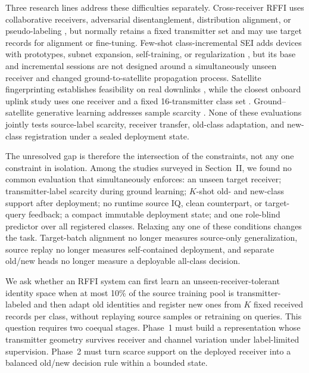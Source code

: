 \documentclass[journal]{IEEEtran}
\begin{document}
Three research lines address these difficulties separately. Cross-receiver RFFI uses collaborative receivers, adversarial disentanglement, distribution alignment, or pseudo-labeling \cite{shen2024receiveragnostic,zhang2024riei,liu2024receiverimpact,feng2025dadda,ma2025channelrobust}, but normally retains a fixed transmitter set and may use target records for alignment or fine-tuning. Few-shot class-incremental SEI adds devices with prototypes, subnet expansion, self-training, or regularization \cite{liu2021csil,li2024selftraining,shi2025dpds,li2025fscilsei,li2025mopchr}, but its base and incremental sessions are not designed around a simultaneously unseen receiver and changed ground-to-satellite propagation process. Satellite fingerprinting establishes feasibility on real downlinks \cite{oligeri2023pastai,smailes2023satiq}, while the closest onboard uplink study uses one receiver and a fixed 16-transmitter class set \cite{tang2023ttc}. Ground--satellite generative learning addresses sample scarcity \cite{zhao2026gsgl}. None of these evaluations jointly tests source-label scarcity, receiver transfer, old-class adaptation, and new-class registration under a sealed deployment state.

The unresolved gap is therefore the intersection of the constraints, not any one constraint in isolation. Among the studies surveyed in Section~II, we found no common evaluation that simultaneously enforces: an unseen target receiver; transmitter-label scarcity during ground learning; \(K\)-shot old- and new-class support after deployment; no runtime source IQ, clean counterpart, or target-query feedback; a compact immutable deployment state; and one role-blind predictor over all registered classes. Relaxing any one of these conditions changes the task. Target-batch alignment no longer measures source-only generalization, source replay no longer measures self-contained deployment, and separate old/new heads no longer measure a deployable all-class decision.

We ask whether an RFFI system can first learn an unseen-receiver-tolerant identity space when at most 10\% of the source training pool is transmitter-labeled and then adapt old identities and register new ones from \(K\) fixed received records per class, without replaying source samples or retraining on queries. This question requires two coequal stages. Phase~1 must build a representation whose transmitter geometry survives receiver and channel variation under label-limited supervision. Phase~2 must turn scarce support on the deployed receiver into a balanced old/new decision rule within a bounded state.
\end{document}
